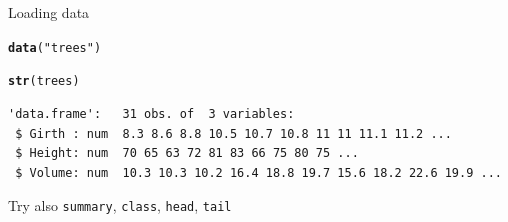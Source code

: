 \documentclass[10pt]{beamer}\usepackage[]{graphicx}\usepackage[]{color}
\makeatletter
\newcommand{\hlstr}[1]{\textcolor[rgb]{0.192,0.494,0.8}{#1}}%
\newcommand{\hlstd}[1]{\textcolor[rgb]{0.345,0.345,0.345}{#1}}%
\newcommand{\hlkwd}[1]{\textcolor[rgb]{0.737,0.353,0.396}{\textbf{#1}}}%
\newenvironment{kframe}{%
 \def\at@end@of@kframe{}%
 \ifinner\ifhmode%
  \def\at@end@of@kframe{\end{minipage}}%
  \begin{minipage}{\columnwidth}%
 \fi\fi%
 \def\FrameCommand##1{\hskip\@totalleftmargin \hskip-\fboxsep
 \colorbox{shadecolor}{##1}\hskip-\fboxsep
     \hskip-\linewidth \hskip-\@totalleftmargin \hskip\columnwidth}%
 \MakeFramed {\advance\hsize-\width
   \@totalleftmargin\z@ \linewidth\hsize
   \@setminipage}}%
 {\par\unskip\endMakeFramed%
 \at@end@of@kframe}
\newenvironment{knitrout}{}{} %
\makeatother
\begin{document}
\begin{frame}[fragile]{Loading data}
  
\begin{knitrout}
\color{fgcolor}\begin{kframe}
\begin{alltt}
  \hlkwd{data}\hlstd{(}\hlstr{"trees"}\hlstd{)}
\end{alltt}
\end{kframe}
\end{knitrout}
  \pause
  
\begin{knitrout}
\color{fgcolor}\begin{kframe}
\begin{alltt}
\hlkwd{str}\hlstd{(trees)}
\end{alltt}
\begin{verbatim}
'data.frame':	31 obs. of  3 variables:
 $ Girth : num  8.3 8.6 8.8 10.5 10.7 10.8 11 11 11.1 11.2 ...
 $ Height: num  70 65 63 72 81 83 66 75 80 75 ...
 $ Volume: num  10.3 10.3 10.2 16.4 18.8 19.7 15.6 18.2 22.6 19.9 ...
\end{verbatim}
\end{kframe}
\end{knitrout}
  
  Try also \texttt{summary}, \texttt{class}, \texttt{head}, \texttt{tail}
\end{frame}
\end{document}
